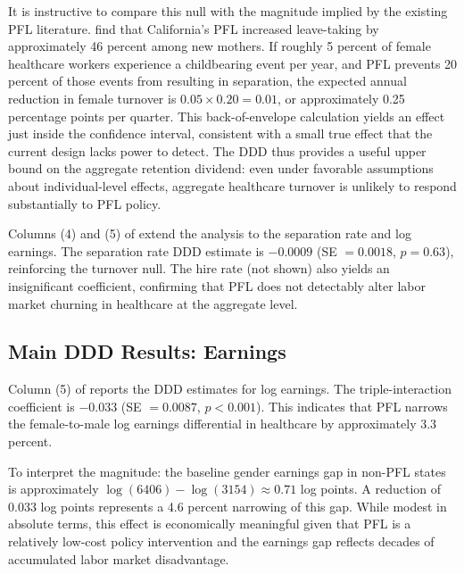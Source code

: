 \documentclass[12pt]{article}
\begin{document}
It is instructive to compare this null with the magnitude implied by the existing PFL literature. \citet{rossinslater2013} find that California's PFL increased leave-taking by approximately 46 percent among new mothers. If roughly 5 percent of female healthcare workers experience a childbearing event per year, and PFL prevents 20 percent of those events from resulting in separation, the expected annual reduction in female turnover is $0.05 \times 0.20 = 0.01$, or approximately 0.25 percentage points per quarter. This back-of-envelope calculation yields an effect just inside the confidence interval, consistent with a small true effect that the current design lacks power to detect. The DDD thus provides a useful upper bound on the aggregate retention dividend: even under favorable assumptions about individual-level effects, aggregate healthcare turnover is unlikely to respond substantially to PFL policy.

Columns (4) and (5) of  extend the analysis to the separation rate and log earnings. The separation rate DDD estimate is $-0.0009$ (SE $= 0.0018$, $p = 0.63$), reinforcing the turnover null. The hire rate (not shown) also yields an insignificant coefficient, confirming that PFL does not detectably alter labor market churning in healthcare at the aggregate level.

\begin{table}[H]
\centering

\end{table}

\subsection{Main DDD Results: Earnings}

Column (5) of  reports the DDD estimates for log earnings. The triple-interaction coefficient is $-0.033$ (SE $= 0.0087$, $p < 0.001$). This indicates that PFL narrows the female-to-male log earnings differential in healthcare by approximately 3.3 percent.

To interpret the magnitude: the baseline gender earnings gap in non-PFL states is approximately $\log(6406) - \log(3154) \approx 0.71$ log points. A reduction of 0.033 log points represents a 4.6 percent narrowing of this gap. While modest in absolute terms, this effect is economically meaningful given that PFL is a relatively low-cost policy intervention and the earnings gap reflects decades of accumulated labor market disadvantage.
\end{document}
